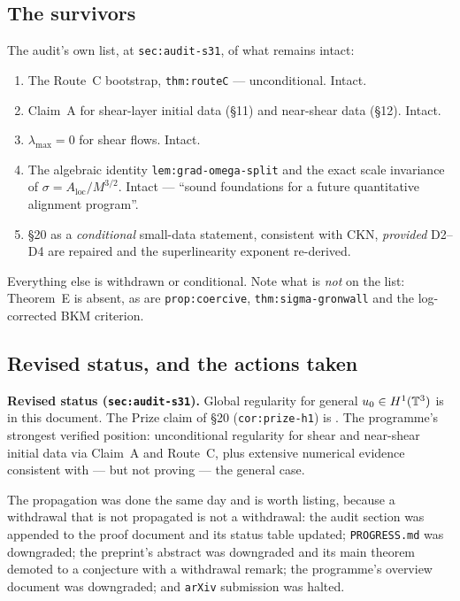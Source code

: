 \subsection{The survivors}

The audit's own list, at \texttt{sec:audit-s31}, of what remains intact:

\begin{enumerate}[leftmargin=2.2em]
\item The Route~C bootstrap, \texttt{thm:routeC} --- unconditional. Intact.
\item Claim~A for shear-layer initial data (\S11) and near-shear data (\S12).
  Intact.
\item \(\lambda_{\max}=0\) for shear flows. Intact.
\item The algebraic identity \texttt{lem:grad-omega-split} and the exact
  scale invariance of \(\sigma=A_{\mathrm{loc}}/M^{3/2}\). Intact ---
  ``sound foundations for a future quantitative alignment program''.
\item \S20 as a \emph{conditional} small-data statement, consistent with CKN,
  \emph{provided} D2--D4 are repaired and the superlinearity exponent
  re-derived.
\end{enumerate}

Everything else is withdrawn or conditional. Note what is \emph{not} on the
list: Theorem~E is absent, as are \texttt{prop:coercive},
\texttt{thm:sigma-gronwall} and the log-corrected BKM criterion.

\subsection{Revised status, and the actions taken}

\begin{record}
\textbf{Revised status (\texttt{sec:audit-s31}).} Global regularity for
general \(u_0\in H^1(\mathbb{T}^3)\) is \OPEN{} in this document. The Prize claim of
\S20 (\texttt{cor:prize-h1}) is \WITHDRAWN. The programme's strongest verified
position: unconditional regularity for shear and near-shear initial data via
Claim~A and Route~C, plus extensive numerical evidence consistent with --- but
not proving --- the general case.
\end{record}

The propagation was done the same day and is worth listing, because a
withdrawal that is not propagated is not a withdrawal: the audit section was
appended to the proof document and its status table updated; \texttt{PROGRESS.md}
was downgraded; the preprint's abstract was downgraded and its main theorem
demoted to a conjecture with a withdrawal remark; the programme's overview
document was downgraded; and \texttt{arXiv} submission was halted.

